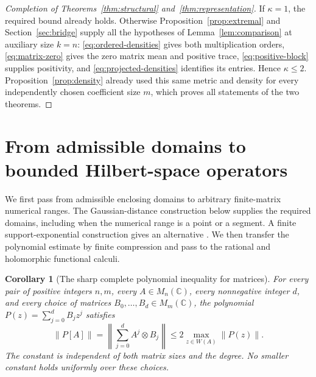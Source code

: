 \documentclass[11pt]{article}
\newcommand{\C}{\mathbb C}
\newtheorem{corollary}[theorem]{Corollary}
\theoremstyle{definition}
\theoremstyle{remark}
\numberwithin{equation}{section}
\begin{document}
\begin{proof}[Completion of Theorems~\ref{thm:structural} and~\ref{thm:representation}]
If $\kappa=1$, the required bound already holds. Otherwise
Proposition~\ref{prop:extremal} and Section~\ref{sec:bridge} supply all
the hypotheses of Lemma~\ref{lem:comparison} at auxiliary size $k=n$:
\eqref{eq:ordered-densities} gives both multiplication orders,
\eqref{eq:matrix-zero} gives the zero matrix mean and positive trace,
\eqref{eq:positive-block} supplies positivity, and
\eqref{eq:projected-densities} identifies its entries. Hence
$\kappa\le2$. Proposition~\ref{prop:density} already used this same
metric and density for every independently chosen coefficient size $m$,
which proves all statements of the two theorems.
\end{proof}

\section{From admissible domains to bounded Hilbert-space operators}\label{sec:limit}
We first pass from admissible enclosing domains to arbitrary finite-matrix
numerical ranges. The Gaussian-distance construction below supplies the
required domains, including when the numerical range is a point or a segment.
A finite support-exponential construction gives an alternative
\cite[Section 4]{Direct}. We then transfer the polynomial estimate by finite
compression and pass to the rational and holomorphic functional calculi.

\begin{corollary}[The sharp complete polynomial inequality for matrices]\label{cor:polynomial}
For every pair of positive integers $n,m$, every $A\in M_n(\C)$,
every nonnegative integer $d$, and every choice of matrices
$B_0,\ldots,B_d\in M_m(\C)$, the polynomial
$P(z)=\sum_{j=0}^dB_jz^j$ satisfies
\[
 \|P[A]\|=\left\|\sum_{j=0}^dA^j\otimes B_j\right\|
 \le2\max_{z\in W(A)}\|P(z)\|.
\]
The constant is independent of both matrix sizes and the degree.
No smaller constant holds uniformly over these choices.
\end{corollary}
\end{document}
